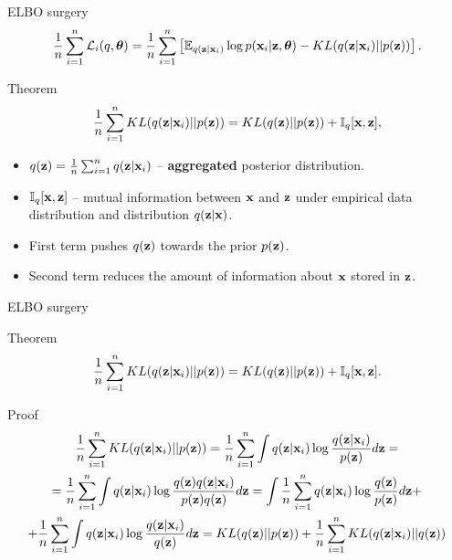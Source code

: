 \begin{frame}{ELBO surgery}
	\vspace{-0.3cm}
	\[
	    \frac{1}{n} \sum_{i=1}^n \mathcal{L}_i(q, \boldsymbol{\theta}) = \frac{1}{n} \sum_{i=1}^n \left[ \mathbb{E}_{q(\mathbf{z} | \mathbf{x}_i)} \log p(\mathbf{x}_i | \mathbf{z}, \boldsymbol{\theta}) - KL(q(\mathbf{z} | \mathbf{x}_i) || p(\mathbf{z})) \right].
	\]
	\vspace{-0.3cm}
	\begin{block}{Theorem}
		\[
		    \frac{1}{n} \sum_{i=1}^n KL(q(\mathbf{z} | \mathbf{x}_i) || p(\mathbf{z})) = KL(q(\mathbf{z}) || p(\mathbf{z})) + \mathbb{I}_{q} [\mathbf{x}, \mathbf{z}],
		\]
		\begin{itemize}
			\item $q(\mathbf{z}) = \frac{1}{n} \sum_{i=1}^n q(\mathbf{z} | \mathbf{x}_i)$ -- \textbf{aggregated} posterior distribution.
			\item $\mathbb{I}_{q} [\mathbf{x}, \mathbf{z}]$ -- mutual information between $\mathbf{x}$ and $\mathbf{z}$ under empirical data distribution and distribution $q(\mathbf{z} | \mathbf{x})$.
			\item First term pushes $q(\mathbf{z})$ towards the prior $p(\mathbf{z})$.
			\item Second term reduces the amount of	information about $\mathbf{x}$ stored in $\mathbf{z}$. 
		\end{itemize}
	\end{block}
\end{frame}
\begin{frame}{ELBO surgery}
	\begin{block}{Theorem}
	\[
	    \frac{1}{n} \sum_{i=1}^n KL(q(\mathbf{z} | \mathbf{x}_i) || p(\mathbf{z})) = KL(q(\mathbf{z}) || p(\mathbf{z})) + \mathbb{I}_q [\mathbf{x}, \mathbf{z}].
	\]
	\end{block}
	\begin{block}{Proof}
	\vspace{-0.3cm}
	{\footnotesize
	\begin{multline*}
	    \frac{1}{n} \sum_{i=1}^n KL(q(\mathbf{z} | \mathbf{x}_i) || p(\mathbf{z})) = \frac{1}{n} \sum_{i=1}^n \int q(\mathbf{z} | \mathbf{x}_i) \log \frac{q(\mathbf{z} | \mathbf{x}_i)}{p(\mathbf{z})} d \mathbf{z} = \\
	    = \frac{1}{n} \sum_{i=1}^n \int q(\mathbf{z} | \mathbf{x}_i) \log \frac{q(\mathbf{z}) q(\mathbf{z} | \mathbf{x}_i)}{p(\mathbf{z})q(\mathbf{z})} d \mathbf{z} 
	    = \int \frac{1}{n} \sum_{i=1}^n  q(\mathbf{z} | \mathbf{x}_i) \log \frac{q(\mathbf{z})}{p(\mathbf{z})} d \mathbf{z} + \\ 
	    + \frac{1}{n}\sum_{i=1}^n \int q(\mathbf{z} | \mathbf{x}_i) \log \frac{q(\mathbf{z} | \mathbf{x}_i)}{q(\mathbf{z})} d \mathbf{z} = 
	     KL (q(\mathbf{z}) || p(\mathbf{z})) + \frac{1}{n}\sum_{i=1}^n KL(q(\mathbf{z} | \mathbf{x}_i) || q (\mathbf{z}))
	\end{multline*}
	}
	\end{block}

\end{frame}
